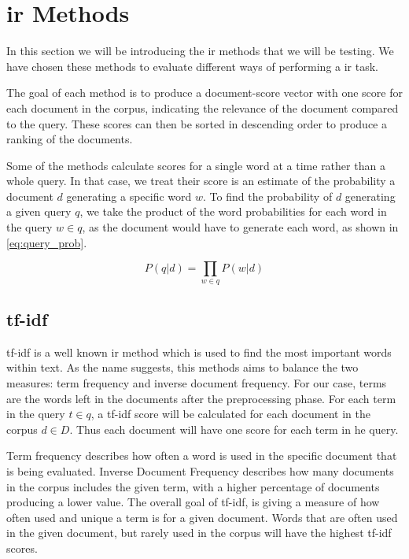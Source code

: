 \section{\gls{ir} Methods}\label{sec:ir_methods}

In this section we will be introducing the \gls{ir} methods that we will be testing.
We have chosen these methods to evaluate different ways of performing a \acrfull{ir} task.

The goal of each method is to produce a document-score vector with one score for each document in the corpus, indicating the relevance of the document compared to the query.
These scores can then be sorted in descending order to produce a ranking of the documents.

Some of the methods calculate scores for a single word at a time rather than a whole query.
In that case, we treat their score is an estimate of the probability a document $d$ generating a specific word $w$.
To find the probability of $d$ generating a given query $q$, we take the product of the word probabilities for each word in the query $w \in q$, as the document would have to generate each word, as shown in \autoref{eq:query_prob}.

\begin{equation}\label{eq:query_prob}
	P(q|d) = \prod_{w \in q} P(w|d)
\end{equation}





\subsection{\acrlong{tf-idf}}
\Gls{tf-idf} is a well known \gls{ir} method which is used to find the most important words within text.
As the name suggests, this methods aims to balance the two measures: term frequency and inverse document frequency.
For our case, terms are the words left in the documents after the preprocessing phase.
For each term in the query $t \in q$, a tf-idf score will be calculated for each document in the corpus $d \in D$.
Thus each document will have one score for each term in he query.


Term frequency describes how often a word is used in the specific document that is being evaluated.
Inverse Document Frequency describes how many documents in the corpus includes the given term, with a higher percentage of documents producing a lower value.
The overall goal of \gls{tf-idf}, is giving a measure of how often used and unique a term is for a given document. Words that are often used in the given document, but rarely used in the corpus will have the highest \gls{tf-idf} scores.

